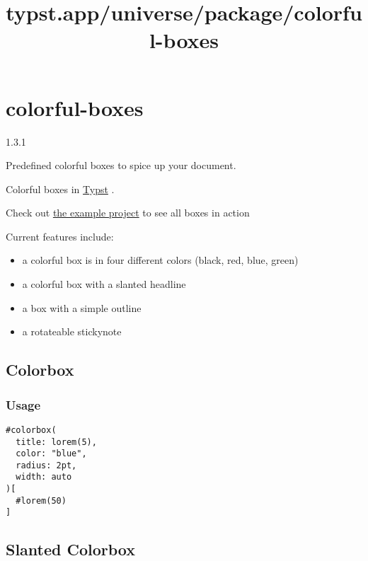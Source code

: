 \title{typst.app/universe/package/colorful-boxes}

\label{banner}
\section{colorful-boxes}\label{colorful-boxes}

{ 1.3.1 }

Predefined colorful boxes to spice up your document.

\label{readme}
Colorful boxes in \href{https://github.com/typst/typst}{Typst} .

Check out \href{https://typst.app/project/rp9q3upfc69bPUCbv0BjzX}{the
example project} to see all boxes in action

Current features include:

\begin{itemize}
\tightlist
\item
  a colorful box is in four different colors (black, red, blue, green)
\item
  a colorful box with a slanted headline
\item
  a box with a simple outline
\item
  a rotateable stickynote
\end{itemize}

\subsection{Colorbox}\label{colorbox}


\subsubsection{Usage}\label{usage}

\begin{verbatim}
#colorbox(
  title: lorem(5),
  color: "blue",
  radius: 2pt,
  width: auto
)[
  #lorem(50)
]
\end{verbatim}

\subsection{Slanted Colorbox}\label{slanted-colorbox}


